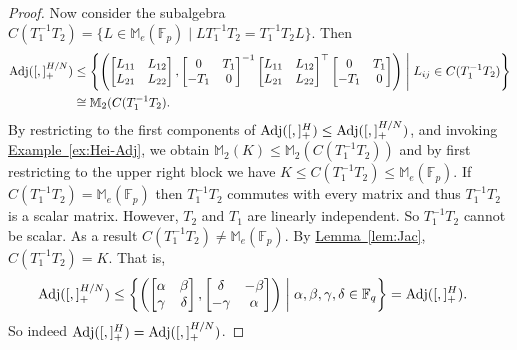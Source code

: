 \documentclass[11pt]{article}
\numberwithin{equation}{section}
\theoremstyle{definition}
\theoremstyle{plain}
\newcommand{\expref}[2]{\hyperref[#2]{#1~\ref{#2}}}
\numberwithin{equation}{section}
\theoremstyle{plain}       %
\theoremstyle{remark}
\theoremstyle{definition}
\numberwithin{figure}{section}
\numberwithin{table}{section}
\newcommand{\bbF}{\mathbb{F}}  %
\begin{document}
\begin{proof}
Now consider the subalgebra $C(T_1^{-1}T_2) = \{ L\in \mathbb{M}_e(\bbF_p) 
\mid LT_1^{-1} T_2=T_1^{-1} T_2L \}$.  Then
\begin{align*}
	{\rm Adj}([,]_+^{H/N}) & \leq \left\{
	\left(\begin{bmatrix} L_{11} & L_{12}\\ L_{21} & L_{22} \end{bmatrix},
		\begin{bmatrix}
			0 & T_1 \\
			-T_1 & 0
		\end{bmatrix}^{-1}
	\begin{bmatrix} L_{11} & L_{12}\\
		 L_{21} & L_{22} \end{bmatrix}^{\top}
		 \begin{bmatrix}
			0 & T_1 \\
			-T_1 & 0
		\end{bmatrix}\right) 
		 \;\middle|\;
	L_{ij}\in C(T_1^{-1}T_2)\right\}\\
	& \cong \mathbb{M}_2(C(T_1^{-1}T_2).
\end{align*}
By restricting to the first components of ${\rm Adj}([,]_+^{H})\leq {\rm
Adj}([,]_+^{H/N})$, and invoking \expref{Example}{ex:Hei-Adj}, we obtain
$\mathbb{M}_2(K)\leq \mathbb{M}_2(C(T_1^{-1}T_2))$ and by first restricting to
the upper right block we have $K\leq C(T_1^{-1}T_2)\leq \mathbb{M}_e(\bbF_p)$.
If $C(T_1^{-1} T_2)=\mathbb{M}_e(\bbF_p)$ then $T_1^{-1} T_2$ commutes with
every matrix and thus $T_1^{-1} T_2$ is a scalar matrix.  However, $T_2$ and
$T_1$ are linearly independent.  So $T_1^{-1}T_2$ cannot be scalar.  As a result
$C(T_1^{-1}T_2)\neq \mathbb{M}_e(\bbF_p)$.  By \expref{Lemma}{lem:Jac},
$C(T_1^{-1}T_2)=K$.  That is, 
\begin{align*}
	{\rm Adj}([,]_+^{H/N}) & \leq \left\{
		\left(\begin{bmatrix} \alpha & \beta \\ \gamma & \delta\end{bmatrix},
		\begin{bmatrix} \delta & -\beta\\ -\gamma & \alpha\end{bmatrix}\right)
			\;\middle |\;
		\alpha,\beta,\gamma,\delta\in\bbF_q\right\}={\rm Adj}([,]_+^H).
\end{align*}
So indeed ${\rm Adj}([,]_+^H)={\rm Adj}([,]_+^{H/N})$.
\end{proof}
\end{document}

